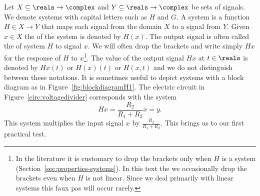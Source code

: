 Let $X \subseteq \reals \to \complex$ and $Y \subseteq \reals \to \complex$ be sets of signals.  We denote systems with capital letters such as $H$ and $G$.  A system is a function $H \in X \to Y$ that maps each signal from the domain $X$ to a signal from $Y$.  Given  $x \in X$ the  of the system is denoted by $H(x)$.  The output signal is often called the  of system $H$ to signal $x$.  We will often drop the brackets and write simply $Hx$ for the response of $H$ to $x$\footnote{In the literature it is customary to drop the brackets only when $H$ is a  system (Section~\ref{sec:properties-systems}).  In this text the we occasionally drop the brackets even when $H$ is not linear.  Since we deal primarily with linear systems this faux pas will occur rarely.}.  The value of the output signal $Hx$ at $t \in \reals$ is denoted by $Hx(t)$ or $H(x)(t)$ or $H(x,t)$ and we do not distinguish between these notations.   %
It is sometimes useful to depict systems with a block diagram as in Figure~\ref{fig:blockdiagramH1}.  The electric circuit in Figure~\ref{circ:voltagedivider} corresponds with the system
\[
Hx = \frac{R_2}{R_1 + R_2} x = y.
\]
This system multiplies the input signal $x$ by $\frac{R_2}{R_1 + R_2}$.  This brings us to our first practical test.


